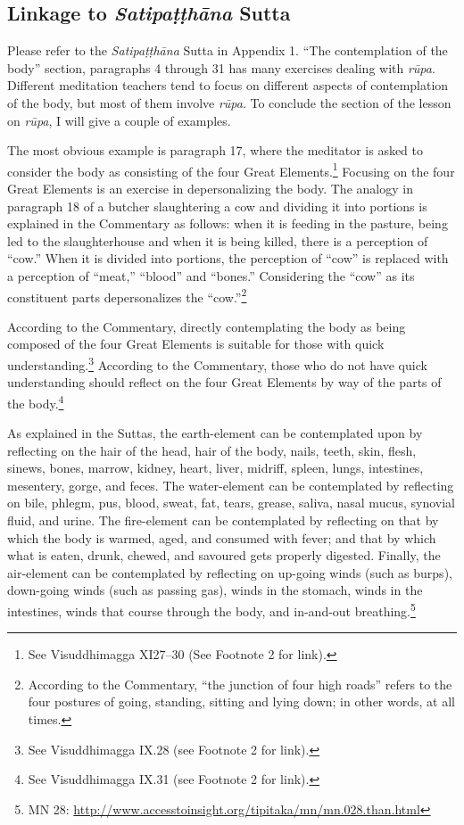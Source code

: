 \subsection*{Linkage to \textit{Satipaṭṭhāna} Sutta}

Please refer to the \textit{Satipaṭṭhāna} Sutta in Appendix 1. “The contemplation of the body” section, paragraphs 4 through 31 has many exercises dealing with \textit{rūpa}. Different meditation teachers tend to focus on different aspects of contemplation of the body, but most of them involve \textit{rūpa}. To conclude the section of the lesson on \textit{rūpa}, I will give a couple of examples.

The most obvious example is paragraph 17, where the meditator is asked to consider the body as consisting of the four Great Elements.\footnote{See Visuddhimagga XI27--30 (See Footnote 2 for link).} Focusing on the four Great Elements is an exercise in depersonalizing the body. The analogy in paragraph 18 of a butcher slaughtering a cow and dividing it into portions is explained in the Commentary as follows: when it is feeding in the pasture, being led to the slaughterhouse and when it is being killed, there is a perception of “cow.” When it is divided into portions, the perception of “cow” is replaced with a perception of “meat,” “blood” and “bones.” Considering the “cow” as its constituent parts depersonalizes the “cow.”\footnote{According to the Commentary, “the junction of four high roads” refers to the four postures of going, standing, sitting and lying down; in other words, at all times.}

According to the Commentary, directly contemplating the body as being composed of the four Great Elements is suitable for those with quick understanding.\footnote{See Visuddhimagga IX.28 (see Footnote 2 for link).} According to the Commentary, those who do not have quick understanding should reflect on the four Great Elements by way of the parts of the body.\footnote{See Visuddhimagga IX.31 (see Footnote 2 for link).} 

As explained in the Suttas, the earth-element can be contemplated upon by reflecting on the hair of the head, hair of the body, nails, teeth, skin, flesh, sinews, bones, marrow, kidney, heart, liver, midriff, spleen, lungs, intestines, mesentery, gorge, and feces. The water-element can be contemplated by reflecting on bile, phlegm, pus, blood, sweat, fat, tears, grease, saliva, nasal mucus, synovial fluid, and urine. The fire-element can be contemplated by reflecting on that by which the body is warmed, aged, and consumed with fever; and that by which what is eaten, drunk, chewed, and savoured gets properly digested. Finally, the air-element can be contemplated by reflecting on up-going winds (such as burps), down-going winds (such as passing gas), winds in the stomach, winds in the intestines, winds that course through the body, and in-and-out breathing.\footnote{MN 28: \url{http://www.accesstoinsight.org/tipitaka/mn/mn.028.than.html}}

